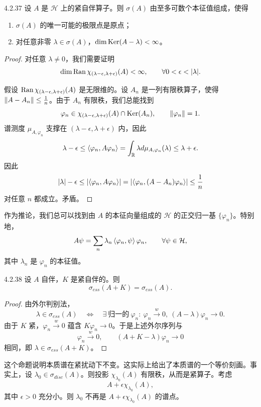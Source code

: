 \begin{theorem}{4.2.37}
  设 $A$ 是 $\mathcal{H}$ 上的紧自伴算子。则 $\sigma(A)$ 由至多可数个本征值组成，使得
  \begin{enumerate}[label=\textcircled{\small\arabic*},leftmargin=2.6em,itemsep=2pt]
    \item $\sigma(A)$ 的唯一可能的极限点是原点；
    \item 对任意非零 $\lambda\in\sigma(A)$，$\dim\operatorname{Ker}(A-\lambda)<\infty$。
  \end{enumerate}
\end{theorem}

\begin{proof}
  对任意 $\lambda\ne0$，我们需要证明
  \[
  \dim\operatorname{Ran}\chi_{(\lambda-\epsilon,\lambda+\epsilon)}(A)<\infty,
  \qquad\forall 0<\epsilon<\lvert \lambda\rvert.
  \]

  假设 $\operatorname{Ran}\chi_{(\lambda-\epsilon,\lambda+\epsilon)}(A)$ 是无限维的。设 $A_n$ 是一列有限秩算子，使得 $\lVert A-A_n\rVert\le\frac1n$。由于 $A_n$ 有限秩，我们总能找到
  \[
  \varphi_n\in\chi_{(\lambda-\epsilon,\lambda+\epsilon)}(A)\cap\operatorname{Ker}(A_n),
  \qquad\lVert \varphi_n\rVert=1.
  \]
  谱测度 $\mu_{A,\varphi_n}$ 支撑在 $(\lambda-\epsilon,\lambda+\epsilon)$ 内，因此
  \[
  \lambda-\epsilon\le\left\langle \varphi_n,A\varphi_n\right\rangle
  =\int_{\mathbb{R}}\lambda d\mu_{A,\varphi_n}(\lambda)\le\lambda+\epsilon.
  \]
  因此
  \[
  \lvert \lambda\rvert-\epsilon\le\lvert \left\langle \varphi_n,A\varphi_n\right\rangle\rvert
  =\lvert \left\langle \varphi_n,(A-A_n)\varphi_n\right\rangle\rvert\le\frac1n
  \]
  对任意 $n$ 都成立。矛盾。
\end{proof}

作为推论，我们总可以找到由 $A$ 的本征向量组成的 $\mathcal{H}$ 的正交归一基 $\{\varphi_n\}$。特别地，
\[
A\psi=\sum_n\lambda_n\left\langle \varphi_n,\psi\right\rangle\varphi_n,\qquad\forall\psi\in\mathcal{H},
\]
其中 $\lambda_n$ 是 $\varphi_n$ 的本征值。

\begin{proposition}{4.2.38}
  设 $A$ 自伴，$K$ 是紧自伴的。则
  \[
  \sigma_{ess}(A+K)=\sigma_{ess}(A).
  \]
\end{proposition}

\begin{proof}
  由外尔判别法，
  \[
  \lambda\in\sigma_{ess}(A)\quad\Longleftrightarrow\quad
  \exists\ \text{归一的}\ \varphi_n:\ \varphi_n\xrightarrow{w}0,\ (A-\lambda)\varphi_n\to0.
  \]
  由于 $K$ 紧，$\varphi_n\xrightarrow{w}0$ 蕴含 $K\varphi_n\to0$。于是上述外尔序列与
  \[
  \varphi_n\xrightarrow{w}0,\qquad (A+K-\lambda)\varphi_n\to0
  \]
  相同，即 $\lambda\in\sigma_{ess}(A+K)$。
\end{proof}

这个命题说明本质谱在紧扰动下不变。这实际上给出了本质谱的一个等价刻画。事实上，设 $\lambda_0\in\sigma_{disc}(A)$。则投影 $\chi_{\lambda_0}(A)$ 有限秩，从而是紧算子。考虑
\[
A+\epsilon\chi_{\lambda_0}(A),
\]
其中 $\epsilon>0$ 充分小。则 $\lambda_0$ 不再是 $A+\epsilon\chi_{\lambda_0}(A)$ 的谱点。


